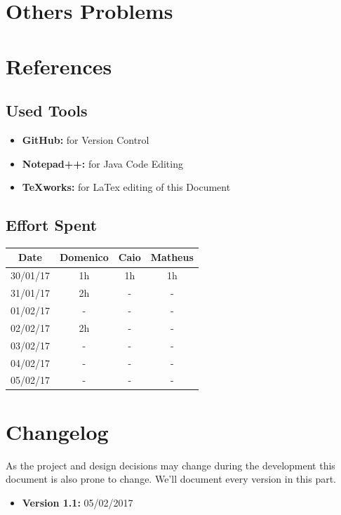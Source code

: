 \documentclass[a4paper]{article}
\begin{document}
\section{Others Problems}

\newpage
\section{References}
\subsection{Used Tools}
\begin{itemize}
	\item \textbf{GitHub:} for Version Control
	\item \textbf {Notepad++:} for Java Code Editing
	\item \textbf {TeXworks:} for LaTex editing of this Document
\end{itemize}

\newpage
\subsection{Effort Spent}
\begin{tabular}{ | c | c | c | c | }
\hline
	\textbf {Date} & \textbf {Domenico} & \textbf {Caio} & \textbf {Matheus} \\ \hline
	30/01/17& 1h & 1h & 1h  \\ \hline
	31/01/17& 2h & - & -  \\ \hline
	01/02/17& - & - & -  \\ \hline
	02/02/17& 2h & - & -  \\ \hline
	03/02/17& - & - & -  \\ \hline
	04/02/17& - & - & -  \\ \hline
	05/02/17& - & - & -  \\ \hline

\end{tabular}
\newpage

\section{Changelog}
As the project and design decisions may change during the development this document is also prone to change.
We'll document every version in this part.
\begin{itemize}
\item \textbf {Version 1.1:} 05/02/2017
\end{itemize}
\end{document}
